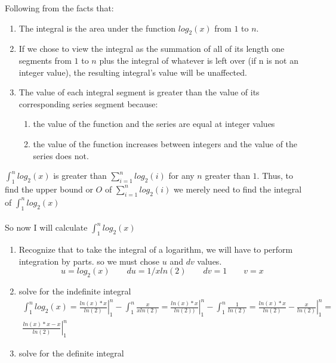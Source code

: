 \documentclass[10pt,a4paper]{article}
\newcommand*\Eval[3]{\left.#1\right\rvert_{#2}^{#3}}
\begin{document}
Following from the facts that:
\begin{enumerate}
\item The integral is the area under the function $log_2(x)$ from $1$ to $n$.
\item If we chose to view the integral as the summation of all of its length one segments from $1$ to $n$ plus the integral of whatever is left over (if n is not an integer value), the resulting integral's value will be unaffected.
\item The value of each integral segment is greater than the value of its corresponding series segment because:
\begin{enumerate}
  \item the value of the function and the series are equal at integer values
  \item the value of the function increases between integers and the value of the series does not.
\end{enumerate}
\end{enumerate}
$\int_1^n log_2(x)$ is greater than $\sum_{i = 1}^n log_2(i)$ for any $n$ greater than $1$. Thus, to find the upper bound or $O$ of $\sum_{i = 1}^n log_2(i)$ we merely need to find the integral of $\int_1^n log_2(x)$\\\\
So now I will calculate $\int_1^n log_2(x)$
\begin{enumerate}
  \item Recognize that to take the integral of a logarithm, we will have to perform integration by parts. so we must chose $u$ and $dv$ values.
  \begin{equation}
    u = log_2(x)\qquad du = 1/xln(2) \qquad dv = 1 \qquad v = x
  \end{equation}
  \item solve for the indefinite integral
  \begin{multline}
    \int_1^n log_2(x) = \Eval{\frac{ln(x)*x}{ln(2)}}{1}{n}- \int_1^n \frac{x}{xln(2)} = \Eval{\frac{ln(x)*x}{ln(2))}}{1}{n} - \int_1^n \frac{1}{ln(2)} = \Eval{\frac{ln(x)*x}{ln(2)} - \frac{x}{ln(2)}}{1}{n} = \\ \Eval{\frac{ln(x)*x-x}{ln(2)}}{1}{n}
  \end{multline}
  \item solve for the definite integral
  \begin{equation*}

  \end{equation*}
\end{enumerate}
\end{document}
